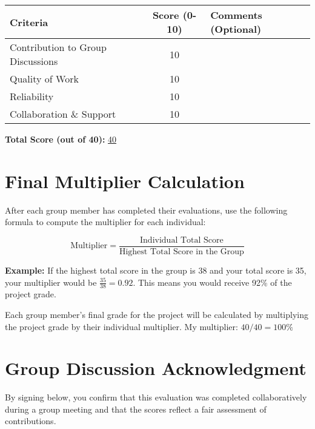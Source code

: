 \documentclass{article}
\begin{document}
\begin{tabular}{|l|c|p{7cm}|}
\hline
\textbf{Criteria} & \textbf{Score (0-10)} & \textbf{Comments (Optional)} \\ \hline
Contribution to Group Discussions & 10 & \\ \hline
Quality of Work & 10 & \\ \hline
Reliability & 10 & \\ \hline
Collaboration \& Support & 10 & \\ \hline
\end{tabular}

\vspace{0.5cm}
\textbf{Total Score (out of 40):} \underline{\hspace{3cm}40}

\section*{Final Multiplier Calculation}

After each group member has completed their evaluations, use the following formula to compute the multiplier for each individual:

\[
\text{Multiplier} = \frac{\text{Individual Total Score}}{\text{Highest Total Score in the Group}}
\]

\textbf{Example:} If the highest total score in the group is 38 and your total score is 35, your multiplier would be \(\frac{35}{38} = 0.92\). This means you would receive 92\% of the project grade.

Each group member's final grade for the project will be calculated by multiplying the project grade by their individual multiplier. My multiplier: $40/40 = 100\%$

\section*{Group Discussion Acknowledgment}

By signing below, you confirm that this evaluation was completed collaboratively during a group meeting and that the scores reflect a fair assessment of contributions.
\end{document}
